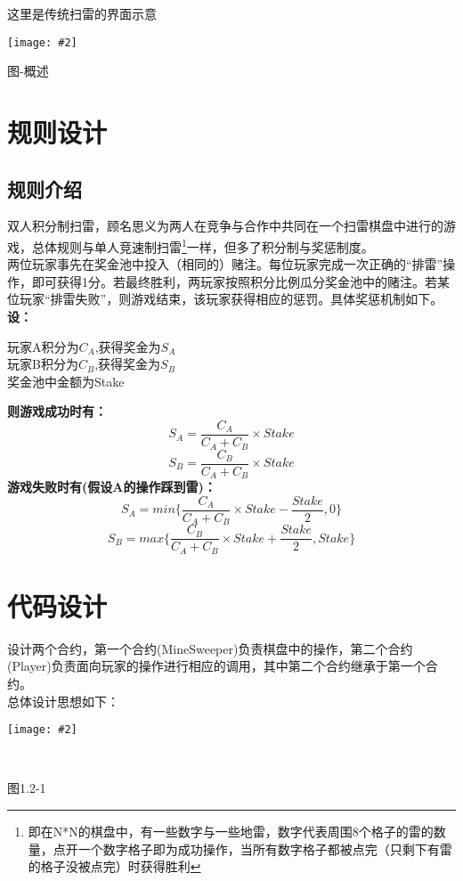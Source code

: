 \documentclass[UTF8]{ctexart}
\newcommand\picturehere[2][1]{\centerline{\texttt{[image: \#2]}}}
\begin{document}
  \indent 这里是传统扫雷的界面示意\\
  \picturehere[0.5]{s2.png}
  \begin{center} 图-概述 \end{center}
  \newpage
  \section{规则设计}
  \subsection*{规则介绍}
  \indent 双人积分制扫雷，顾名思义为两人在竞争与合作中共同在一个扫雷棋盘中进行的游戏，总体规则与单人竞速制扫雷\footnote{即在N*N的棋盘中，有一些数字与一些地雷，数字代表周围8个格子的雷的数量，点开一个数字格子即为成功操作，当所有数字格子都被点完（只剩下有雷的格子没被点完）时获得胜利}一样，但多了积分制与奖惩制度。\\
  \indent 两位玩家事先在奖金池中投入（相同的）赌注。每位玩家完成一次正确的“排雷”操作，即可获得1分。若最终胜利，两玩家按照积分比例瓜分奖金池中的赌注。若某位玩家“排雷失败”，则游戏结束，该玩家获得相应的惩罚。具体奖惩机制如下。\\
 \indent \indent \heiti \textbf{设：}  \\
 \songti
  \begin{center} 玩家A积分为$C_A$,获得奖金为$S_A$\\玩家B积分为$C_B$,获得奖金为$S_B$ \\ 奖金池中金额为Stake \\
  \end{center}

  \indent \indent \heiti \textbf{则游戏成功时有：}\\
  \songti
  $$
  S_A=\frac{C_A}{C_A+C_B} \times Stake
  $$
  $$
  S_B=\frac{C_B}{C_A+C_B} \times Stake
  $$
  \indent \indent \heiti \textbf{游戏失败时有(假设A的操作踩到雷)：}\\
  $$
  S_A=min\{\frac{C_A}{C_A+C_B} \times Stake - \frac{Stake}{2},0\}
  $$
  $$
  S_B=max\{\frac{C_B}{C_A+C_B} \times Stake + \frac{Stake}{2},Stake\}
  $$
  \newpage
  \section{代码设计}
  \indent 设计两个合约，第一个合约(MineSweeper)负责棋盘中的操作，第二个合约(Player)负责面向玩家的操作进行相应的调用，其中第二个合约继承于第一个合约。\\
  总体设计思想如下：\\
  \picturehere[0.8]{s3.png}\\
  \begin{center} 图1.2-1 \end{center}
  \newpage
\end{document}
